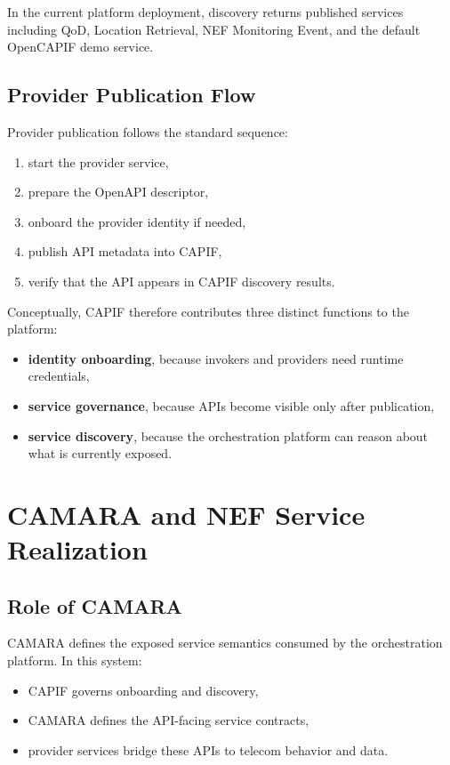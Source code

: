 \documentclass[conference]{IEEEtran}
\begin{document}
In the current platform deployment, discovery returns published services including QoD, Location Retrieval, NEF Monitoring Event, and the default OpenCAPIF demo service.

\subsection{Provider Publication Flow}

Provider publication follows the standard sequence:

\begin{enumerate}[leftmargin=1.1em]
\item start the provider service,
\item prepare the OpenAPI descriptor,
\item onboard the provider identity if needed,
\item publish API metadata into CAPIF,
\item verify that the API appears in CAPIF discovery results.
\end{enumerate}

Conceptually, CAPIF therefore contributes three distinct functions to the platform:

\begin{itemize}[leftmargin=1.1em]
\item \textbf{identity onboarding}, because invokers and providers need runtime credentials,
\item \textbf{service governance}, because APIs become visible only after publication,
\item \textbf{service discovery}, because the orchestration platform can reason about what is currently exposed.
\end{itemize}

\section{CAMARA and NEF Service Realization}

\subsection{Role of CAMARA}

CAMARA defines the exposed service semantics consumed by the orchestration platform. In this system:

\begin{itemize}[leftmargin=1.1em]
\item CAPIF governs onboarding and discovery,
\item CAMARA defines the API-facing service contracts,
\item provider services bridge these APIs to telecom behavior and data.
\end{itemize}
\end{document}
